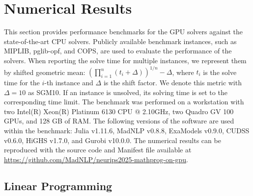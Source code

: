 \documentclass{article}
\begin{document}
\section{Numerical Results}\label{eqn:num}
This section provides performance benchmarks for the GPU solvers against the state-of-the-art CPU solvers.
Publicly available benchmark instances, such as MIPLIB, pglib-opf, and COPS, are used to evaluate the performance of the solvers.
When reporting the solve time for multiple instances, we represent them by shifted geometric mean: $\left(\prod_{i=1}^n (t_i + \Delta)\right)^{1/n} - \Delta$, where $t_i$ is the solve time for the $i$-th instance and $\Delta$ is the shift factor.
We denote this metric with $\Delta = 10$ as SGM10.
If an instance is unsolved, its solving time is set to the corresponding time limit.
The benchmark was performed on a workstation with two Intel(R) Xeon(R) Platinum 6130 CPU @ 2.10GHz, two Quadro GV 100 GPUs, and 128 GB of RAM.
The following versions of the software are used within the benchmark: Julia v1.11.6, MadNLP v0.8.8, ExaModels v0.9.0, CUDSS v0.6.0, HiGHS v1.7.0, and Gurobi v10.0.0.
The numerical results can be reproduced with the source code and Manifest file available at \url{https://github.com/MadNLP/neurips2025-mathprog-on-gpu}.

\subsection{Linear Programming}
\end{document}

